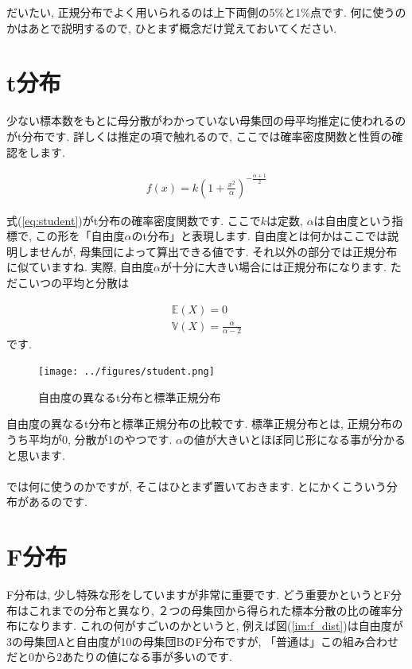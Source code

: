 \documentclass[11pt,a4paper,uplatex]{ujreport} 	%
\begin{document}
だいたい, 正規分布でよく用いられるのは上下両側の5\%と1\%点です. 何に使うのかはあとで説明するので, ひとまず概念だけ覚えておいてください.

\section{t分布}
少ない標本数をもとに母分散がわかっていない母集団の母平均推定に使われるのがt分布です. 詳しくは推定の項で触れるので, ここでは確率密度関数と性質の確認をします.

\begin{align}
\label{eq:student}
f(x) = k(1 + \frac{x^2}{\alpha})^{-\frac{\alpha+1}{2}}
\end{align}

式(\ref{eq:student})がt分布の確率密度関数です. ここで$k$は定数, $\alpha$は自由度という指標で, この形を「自由度$\alpha$のt分布」と表現します. 自由度とは何かはここでは説明しませんが, 母集団によって算出できる値です. それ以外の部分では正規分布に似ていますね. 実際, 自由度$\alpha$が十分に大きい場合には正規分布になります. ただこいつの平均と分散は

\begin{align}
\mathbb{E}(X) = 0\\
\mathbb{V}(X) = \frac{\alpha}{\alpha-2}
\end{align}
です. 

\begin{figure}[H]
\label{im:student}
  \centering
  \texttt{[image: ../figures/student.png]}
  \caption{自由度の異なるt分布と標準正規分布}
\end{figure}

自由度の異なるt分布と標準正規分布の比較です. 標準正規分布とは, 正規分布のうち平均が0, 分散が1のやつです. $\alpha$の値が大きいとほぼ同じ形になる事が分かると思います.\\
\\

では何に使うのかですが, そこはひとまず置いておきます. とにかくこういう分布があるのです.


\section{F分布}
F分布は, 少し特殊な形をしていますが非常に重要です. どう重要かというとF分布はこれまでの分布と異なり, ２つの母集団から得られた標本分散の比の確率分布になります. これの何がすごいのかというと, 例えば図(\ref{im:f_dist})は自由度が3の母集団Aと自由度が10の母集団BのF分布ですが, 「普通は」この組み合わせだと0から2あたりの値になる事が多いのです. \\
\\
\end{document}

